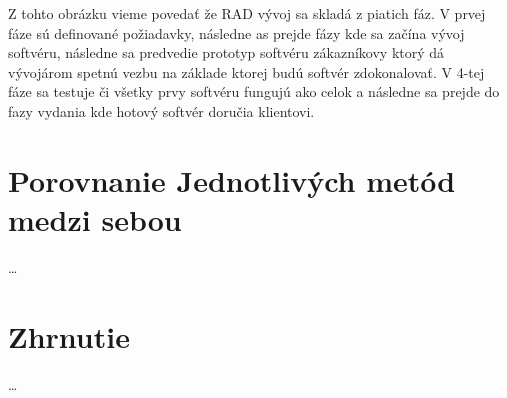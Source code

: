 \documentclass[10pt,oneside,slovak,a4paper]{article}
\begin{document}
Z tohto obrázku vieme povedať že RAD vývoj sa skladá z piatich fáz. V prvej fáze sú definované požiadavky, následne as prejde fázy kde sa začína vývoj softvéru, následne sa predvedie prototyp softvéru zákazníkovy ktorý dá vývojárom spetnú vezbu na základe ktorej budú softvér zdokonalovať. V 4-tej fáze sa testuje či všetky prvy softvéru fungujú ako celok a následne sa prejde do fazy vydania kde hotový softvér doručia klientovi. 
\section{Porovnanie Jednotlivých metód medzi sebou}\label{porovnávanie}
\ldots
\section{Zhrnutie}\label{zaver}
\ldots


\end{document}
